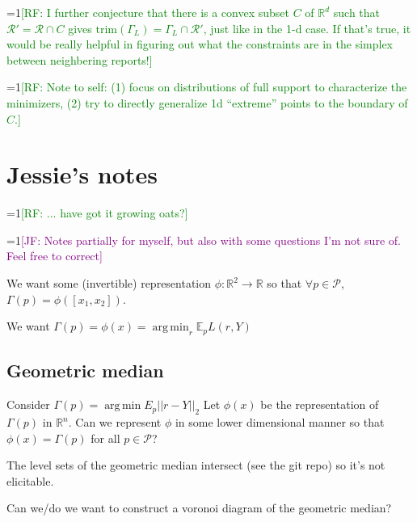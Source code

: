 \documentclass[11pt]{article}
\newcommand{\Comments}{1}
\newcommand{\mynote}[2]{\ifnum\Comments=1\textcolor{#1}{#2}\fi}
\newcommand{\raf}[1]{\mynote{green}{[RF: #1]}}
\newcommand{\jessie}[1]{\mynote{purple}{[JF: #1]}}
\newcommand{\reals}{\mathbb{R}}
\newcommand{\E}{\mathbb{E}}
\renewcommand{\P}{\mathcal{P}}
\newcommand{\R}{\mathcal{R}}
\renewcommand{\P}{\mathcal{P}}
\newcommand{\trim}{\mathrm{trim}}
\DeclareMathOperator*{\argmin}{arg\,min}
\begin{document}
\raf{I further conjecture that there is a convex subset $C$ of $\reals^d$ such that $\R' = \R\cap C$ gives $\trim(\Gamma_L) = \Gamma_L\cap \R'$, just like in the 1-d case.  If that's true, it would be really helpful in figuring out what the constraints are in the simplex between neighbering reports!}

\raf{Note to self: (1) focus on distributions of full support to characterize the minimizers, (2) try to directly generalize 1d ``extreme'' points to the boundary of $C$.}


\section{Jessie's notes}
\raf{... have got it growing oats?}

\jessie{Notes partially for myself, but also with some questions I'm not sure of.  Feel free to correct}

We want some (invertible) representation $\phi: \reals^2 \to \reals$ so that $\forall p \in \P$, $\Gamma(p) = \phi([ x_1, x_2 ])$.

We want $\Gamma(p) = \phi(x) = \argmin_r \E_p L(r, Y)$

\subsection{Geometric median}
Consider $\Gamma(p) = \argmin E_p ||r - Y ||_2$
Let $\phi(x)$ be the representation of $\Gamma(p)$ in $\reals^n$.
Can we represent $\phi$ in some lower dimensional manner so that $\phi(x) = \Gamma(p)$ for all $p \in \P$?

The level sets of the geometric median intersect (see the git repo) so it's not elicitable.

Can we/do we want to construct a voronoi diagram of the geometric median?
\end{document}
